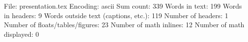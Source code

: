 File: presentation.tex
Encoding: ascii
Sum count: 339
Words in text: 199
Words in headers: 9
Words outside text (captions, etc.): 119
Number of headers: 1
Number of floats/tables/figures: 23
Number of math inlines: 12
Number of math displayed: 0

